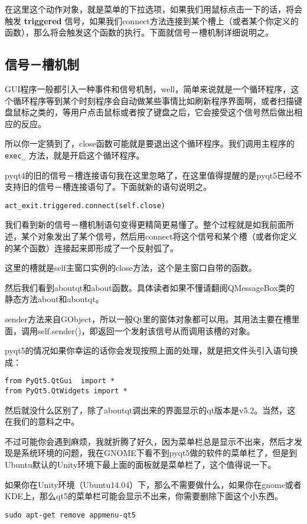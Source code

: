 \documentclass[11pt,oneside]{article}
\begin{document}
在这里这个动作对象，就是菜单的下拉选项，如果我们用鼠标点击一下的话，将会触发 \textbf{triggered} 信号，如果我们connect方法连接到某个槽上（或者某个你定义的函数），那么将会触发这个函数的执行。下面就信号－槽机制详细说明之。

\subsection{信号－槽机制}
\label{sec:orgheadline13}
GUI程序一般都引入一种事件和信号机制，well，简单来说就是一个循环程序，这个循环程序等到某个时刻程序会自动做某些事情比如刷新程序界面啊，或者扫描键盘鼠标之类的，等用户点击鼠标或者按了键盘之后，它会接受这个信号然后做出相应的反应。

所以你一定猜到了，close函数可能就是要退出这个循环程序。我们调用主程序的 \texttt{exec\_} 方法，就是开启这个循环程序。

pyqt4的旧的信号－槽连接语句我在这里忽略了，在这里值得提醒的是pyqt5已经不支持旧的信号－槽连接语句了。下面就新的语句说明之。

\begin{verbatim}
act_exit.triggered.connect(self.close)
\end{verbatim}

我们看到新的信号－槽机制语句变得更精简更易懂了。整个过程就是如我前面所述，某个对象发出了某个信号，然后用connect将这个信号和某个槽（或者你定义的某个函数）连接起来即形成了一个反射弧了。

这里的槽就是self主窗口实例的close方法，这个是主窗口自带的函数。

然后我们看到aboutqt和about函数。具体读者如果不懂请翻阅QMessageBox类的静态方法about和aboutqt。

sender方法来自GObject，所以一般Qt里的窗体对象都可以用。其用法主要在槽里面，调用self.sender()，即返回一个发射该信号从而调用该槽的对象。

pyqt5的情况如果你幸运的话你会发现按照上面的处理，就是把文件头引入语句换成：
\begin{verbatim}
from PyQt5.QtGui  import *
from PyQt5.QtWidgets import *
\end{verbatim}

然后就没什么区别了，除了aboutqt调出来的界面显示的qt版本是v5.2。当然，这在我们的意料之中。

不过可能你会遇到麻烦，我就折腾了好久，因为菜单栏总是显示不出来，然后才发现是系统环境的问题，我在GNOME下看不到pyqt5做的软件的菜单栏了，但是到Ubuntu默认的Unity环境下最上面的面板就是菜单栏了，这个值得说一下。

如果你在Unity环境（Ubuntu14.04）下，那么不需要做什么，如果你在gnome或者KDE上，那么qt5的菜单栏可能会显示不出来，你需要删除下面这个小东西。
\begin{verbatim}
sudo apt-get remove appmenu-qt5
\end{verbatim}
\end{document}
